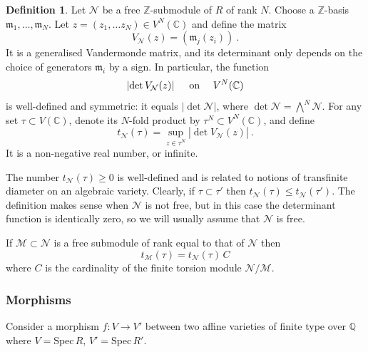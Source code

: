 \documentclass[a4paper,10pt]{amsart}
\theoremstyle{definition}
\newtheorem{defn}[thm]{Definition}
\theoremstyle{remark}
\numberwithin{equation}{section}
\newcommand{\Z}{\mathbb Z}
\newcommand{\Q}{\mathbb Q}
\newcommand{\C}{\mathbb C}
\newcommand{\m}{\mathfrak{m}}
\newcommand{\0}{\color{blue}{\mathsf{0}}}
\begin{document}
   
  \begin{defn}  \label{defn: VdMdet} Let $\mathcal{N}$ be a free $\Z$-submodule of $R$ of rank $N$.  Choose a $\Z$-basis $\m_1,\ldots, \m_N$.  Let $z=(z_1,\ldots z_N) \in  V^N(\C)$ and define the matrix
    \begin{equation} \label{eqn: VNdef} V_{\mathcal{N}}(z) =  \left( \m_j(z_i) \right)  \ . \end{equation}
  It is a generalised Vandermonde matrix, and  its determinant only depends on the  choice of generators $\m_i$ by  a sign. In particular, the function
  \[ \left| \det V_{\mathcal{N}}(z) \right|  \quad  \hbox{ on  } \quad  V^N(\C) \]
   is well-defined and symmetric: it equals $ \left|  \det \mathcal{N} \right|$, where $\det \mathcal{N} = \bigwedge^{\!\!N} \mathcal{N}$. 
   For any set $\tau \subset V(\C)$, denote its $N$-fold product  by $\tau^N \subset V^N(\C)$,  and  define
  \begin{equation} \label{eqn: tNdef}  t_{\mathcal{N}}( \tau ) = \sup_{z\in \tau^N}   \left|  \det   V_{\mathcal{N}}(z)      \right|  \  . \end{equation}
  It is a non-negative real number, or infinite. 
  \end{defn} 
  The number $ t_{\mathcal{N}}( \tau )\geq 0$  is well-defined and is related to notions of transfinite diameter on an algebraic variety.
  Clearly,  if $\tau\subset \tau'$ then $ t_{\mathcal{N}}( \tau )\leq  t_{\mathcal{N}}( \tau' )$. 
  The definition makes sense when $\mathcal{N}$ is not free, but in this case the determinant function  is identically zero, so we will usually assume that $\mathcal{N}$ is free. 


  If $\mathcal{M} \subset \mathcal{N}$ is a free submodule of  rank equal to that of $\mathcal{N}$ then 
  \begin{equation}  \label{eqn: tscalestorsion}  t_{\mathcal{M}}( \tau ) =  t_{\mathcal{N}}( \tau ) \,   C  \end{equation} 
  where $C$ is the cardinality of the finite torsion module  $\mathcal{N}/\mathcal{M}$.  
   
 
 
 \subsubsection{Morphisms}  \label{subsect: morphisms} Consider a morphism
 $f: V \rightarrow V'$
 between two affine varieties of finite type over $\Q$ where $V=\mathrm{Spec}\, R$, $V'=\mathrm{Spec}\, R'$.
 
\end{document}
